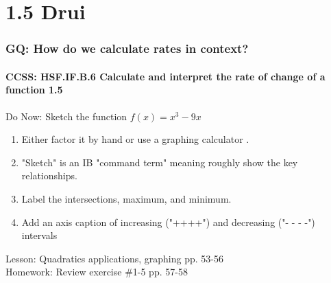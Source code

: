 \documentclass{beamer}
\begin{document}
  \section{1.5 Drui}
  \frame
  {
    \frametitle{GQ: How do we calculate rates in context?}
    \framesubtitle{CCSS: HSF.IF.B.6 Calculate and interpret the rate of change of a function   \alert{1.5}}

    \begin{block}{Do Now: Sketch the function $f(x)=x^3-9x$}
      \begin{enumerate}
      \item Either factor it by hand or use a graphing calculator .
      \item "Sketch" is an IB "command term" meaning roughly show the key relationships.
      \item Label the intersections, maximum, and minimum.
      \item Add an axis caption of increasing ("++++") and decreasing ("- - - -") intervals
      \end{enumerate}
   \end{block}
    Lesson: Quadratics applications, graphing pp. 53-56\\ \bigskip
    Homework: Review exercise \#1-5 pp. 57-58
  }

  
\end{document}
